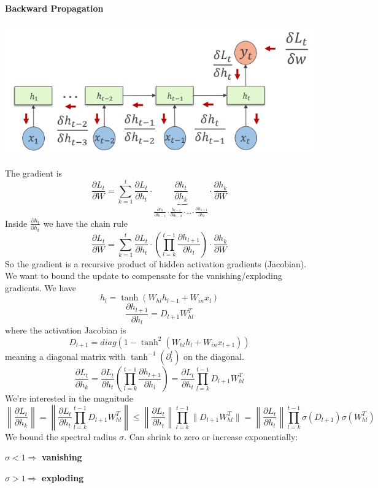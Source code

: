\documentclass[10pt]{report}
\begin{document}
\paragraph{Backward Propagation}
\begin{center}
	\includegraphics[scale=0.5]{156.png}
\end{center}
The gradient is
$$\frac{\partial L_t}{\partial W} = \sum_{k=1}^t\frac{\partial L_t}{\partial h_t}\cdot\underset{{\frac{\partial h_t}{\partial h_{t-1}}\cdot\frac{h_{t-1}}{\partial h_{t-2}}\cdot\ldots\cdot\frac{\partial h_{k+1}}{\partial h_k}}}{\underbrace{\frac{\partial h_t}{\partial h_k}}}\cdot\frac{\partial h_k}{\partial W}$$
Inside $\frac{\partial h_t}{\partial h_k}$ we have the chain rule
$$\frac{\partial L_t}{\partial W} =  \sum_{k=1}^t\frac{\partial L_t}{\partial h_t}\cdot\left(\prod_{l=k}^{t-1}\frac{\partial h_{l+1}}{\partial h_l}\right)\cdot\frac{\partial h_k}{\partial W}$$
So the gradient is a recursive product of hidden activation gradients (Jacobian). We want to bound the update to compensate for the vanishing/exploding gradients. We have $$h_l = \tanh(W_{hl}h_{l-1}+W_{in}x_l)$$ $$\frac{\partial h_{l+1}}{\partial h_l} = D_{l+1}W_{hl}^T$$ where the activation Jacobian is $$D_{l+1} = diag(1-\tanh^2(W_{hl}h_l + W_{in}x_{l+1}))$$
meaning a diagonal matrix with $\tanh^{-1}(\partial_i^t)$ on the diagonal.
$$\frac{\partial L_t}{\partial h_k} = \frac{\partial L_t}{\partial h_t}\left(\prod_{l=k}^{t-1}\frac{\partial h_{l+1}}{\partial h_l}\right) = \frac{\partial L_t}{\partial h_t}\prod_{l=k}^{t-1}D_{l+1}W_{hl}^T $$
We're interested in the magnitude 
$$\left\|\frac{\partial L_t}{\partial h_k}\right\| = \left\|\frac{\partial L_t}{\partial h_t}\prod_{l=k}^{t-1}D_{l+1}W_{hl}^T\right\|\leq \left\|\frac{\partial L_t}{\partial h_t}\right\|\prod_{l=k}^{t-1}\|D_{l+1}W_{hl}^T\|= \left\|\frac{\partial L_t}{\partial h_t}\right\|\prod_{l=k}^{t-1}\sigma(D_{l+1})\sigma(W_{hl}^T)$$
We bound the spectral radius $\sigma$. Can shrink to zero or increase exponentially:\begin{list}{}{}
	\item $\sigma < 1 \Rightarrow$ \textbf{vanishing}
	\item $\sigma > 1 \Rightarrow$ \textbf{exploding}
\end{list}
\end{document}
